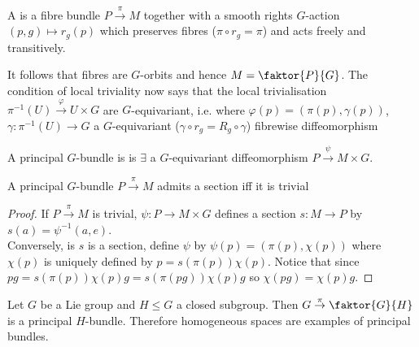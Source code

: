 \documentclass{article}
\begin{document}
\begin{definition}
A  is a fibre bundle $P\overset{\pi}{\to}M$ together with a smooth rights $G$-action $(p,g)\mapsto r_g(p)$ which preserves fibres ($\pi\circ r_g = \pi$) and acts freely and transitively. 
\end{definition}
It follows that fibres are $G$-orbits and hence $M = \faktor{P}{G}$. The condition of local triviality now says that the local trivialisation $\pi^{-1}(U) \overset{\varphi}{\to} U \times G$ are $G$-equivariant, i.e. where $\varphi(p) = (\pi(p),\gamma(p))$, $\gamma:\pi^{-1}(U) \to G$ a $G$-equivariant ($\gamma \circ r_g = R_g \circ \gamma$) fibrewise diffeomorphism

\begin{definition}
A principal $G$-bundle is  is $\exists$ a $G$-equivariant diffeomorphism $P\overset{\psi}{\to} M \times G$.
\end{definition}

\begin{prop}
A principal $G$-bundle $P\overset{\pi}{\to}M$ admits a section iff it is trivial
\end{prop}
\begin{proof}
If $P\overset{\pi}{\to}M$ is trivial, $\psi : P \to M \times G$ defines a section $s : M \to P$ by $s(a) = \psi^{-1}(a,e)$. \\
Conversely, is $s$ is a section, define $\psi$ by $\psi(p) = (\pi(p),\chi(p))$ where $\chi(p)$ is uniquely defined by $p = s(\pi(p))\chi(p)$. Notice that since $pg = s(\pi(p))\chi(p)g = s(\pi(pg))\chi(p)g $ so $\chi(pg) = \chi(p)g$. 
\end{proof}

\begin{example}
Let $G$ be a Lie group and $H \leq G$ a closed subgroup. Then $G \overset{\pi}{\to}\faktor{G}{H}$ is a principal $H$-bundle. Therefore homogeneous spaces are examples of principal bundles. 
\end{example}
\end{document}
